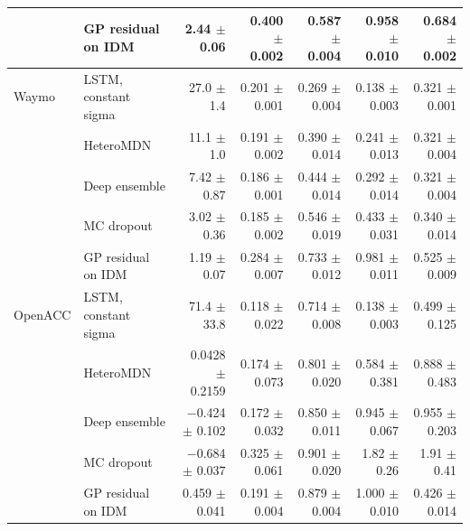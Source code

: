 \begin{table}[htbp]
\begin{tabular}{llrrrrr}
 & GP residual on IDM & 2.44 $\pm$ 0.06 & 0.400 $\pm$ 0.002 & 0.587 $\pm$ 0.004 & 0.958 $\pm$ 0.010 & 0.684 $\pm$ 0.002 \\
\midrule
Waymo & LSTM, constant sigma & 27.0 $\pm$ 1.4 & 0.201 $\pm$ 0.001 & 0.269 $\pm$ 0.004 & 0.138 $\pm$ 0.003 & 0.321 $\pm$ 0.001 \\
 & HeteroMDN & 11.1 $\pm$ 1.0 & 0.191 $\pm$ 0.002 & 0.390 $\pm$ 0.014 & 0.241 $\pm$ 0.013 & 0.321 $\pm$ 0.004 \\
 & Deep ensemble & 7.42 $\pm$ 0.87 & 0.186 $\pm$ 0.001 & 0.444 $\pm$ 0.014 & 0.292 $\pm$ 0.014 & 0.321 $\pm$ 0.004 \\
 & MC dropout & 3.02 $\pm$ 0.36 & 0.185 $\pm$ 0.002 & 0.546 $\pm$ 0.019 & 0.433 $\pm$ 0.031 & 0.340 $\pm$ 0.014 \\
 & GP residual on IDM & 1.19 $\pm$ 0.07 & 0.284 $\pm$ 0.007 & 0.733 $\pm$ 0.012 & 0.981 $\pm$ 0.011 & 0.525 $\pm$ 0.009 \\
\midrule
OpenACC & LSTM, constant sigma & 71.4 $\pm$ 33.8 & 0.118 $\pm$ 0.022 & 0.714 $\pm$ 0.008 & 0.138 $\pm$ 0.003 & 0.499 $\pm$ 0.125 \\
 & HeteroMDN & 0.0428 $\pm$ 0.2159 & 0.174 $\pm$ 0.073 & 0.801 $\pm$ 0.020 & 0.584 $\pm$ 0.381 & 0.888 $\pm$ 0.483 \\
 & Deep ensemble & $-$0.424 $\pm$ 0.102 & 0.172 $\pm$ 0.032 & 0.850 $\pm$ 0.011 & 0.945 $\pm$ 0.067 & 0.955 $\pm$ 0.203 \\
 & MC dropout & $-$0.684 $\pm$ 0.037 & 0.325 $\pm$ 0.061 & 0.901 $\pm$ 0.020 & 1.82 $\pm$ 0.26 & 1.91 $\pm$ 0.41 \\
 & GP residual on IDM & 0.459 $\pm$ 0.041 & 0.191 $\pm$ 0.004 & 0.879 $\pm$ 0.004 & 1.000 $\pm$ 0.010 & 0.426 $\pm$ 0.014 \\
\bottomrule
\end{tabular}
\end{table}

